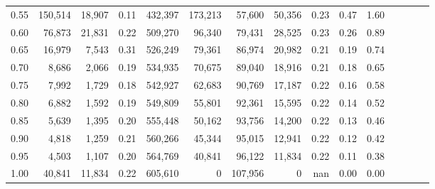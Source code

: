 \begin{tabular}{rrrcrrrrrrrrrrr}
0.55 &  150,514 &  18,907 &                                       0.11 &  432,397 &  173,213 &   57,600 &  50,356 &  0.23 &  0.47 &                         1.60 \\
0.60 &   76,873 &  21,831 &                                       0.22 &  509,270 &   96,340 &   79,431 &  28,525 &  0.23 &  0.26 &                         0.89 \\
0.65 &   16,979 &   7,543 &                                       0.31 &  526,249 &   79,361 &   86,974 &  20,982 &  0.21 &  0.19 &                         0.74 \\
0.70 &    8,686 &   2,066 &                                       0.19 &  534,935 &   70,675 &   89,040 &  18,916 &  0.21 &  0.18 &                         0.65 \\
0.75 &    7,992 &   1,729 &                                       0.18 &  542,927 &   62,683 &   90,769 &  17,187 &  0.22 &  0.16 &                         0.58 \\
0.80 &    6,882 &   1,592 &                                       0.19 &  549,809 &   55,801 &   92,361 &  15,595 &  0.22 &  0.14 &                         0.52 \\
0.85 &    5,639 &   1,395 &                                       0.20 &  555,448 &   50,162 &   93,756 &  14,200 &  0.22 &  0.13 &                         0.46 \\
0.90 &    4,818 &   1,259 &                                       0.21 &  560,266 &   45,344 &   95,015 &  12,941 &  0.22 &  0.12 &                         0.42 \\
0.95 &    4,503 &   1,107 &                                       0.20 &  564,769 &   40,841 &   96,122 &  11,834 &  0.22 &  0.11 &                         0.38 \\
1.00 &   40,841 &  11,834 &                                       0.22 &  605,610 &        0 &  107,956 &       0 &   nan &  0.00 &                         0.00 \\
\bottomrule
\end{tabular}

